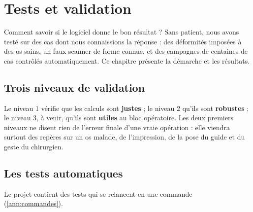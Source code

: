 \chapter{Tests et validation}
\label{chap:validation}

\begin{chapeau}
Comment savoir si le logiciel donne le bon résultat ? Sans patient, nous avons testé sur des cas dont nous
connaissions la réponse : des déformités imposées à des os sains, un faux scanner de forme connue, et des campagnes de
centaines de cas contrôlés automatiquement. Ce chapitre présente la démarche et les résultats.
\end{chapeau}

\section{Trois niveaux de validation}


Le niveau 1 vérifie que les calculs sont \textbf{justes} ; le niveau 2 qu'ils sont \textbf{robustes} ; le niveau 3, à
venir, qu'ils sont \textbf{utiles} au bloc opératoire. Les deux premiers niveaux ne disent rien de l'erreur finale
d'une vraie opération : elle viendra surtout des repères sur un os malade, de l'impression, de la pose du guide et du
geste du chirurgien.

\section{Les tests automatiques}

Le projet contient des tests qui se relancent en une commande (\cref{ann:commandes}).

